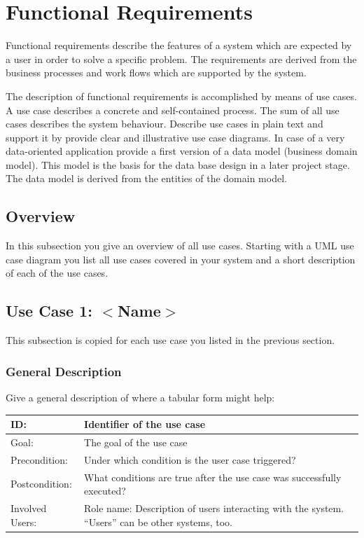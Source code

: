 \documentclass[12pt]{article}
\theoremstyle{definition}
\newenvironment{explanation}{%
   \setlength{\parindent}{0pt}
   \itshape
   \color{blue}
}{}
\begin{document}
\section{Functional Requirements}
\begin{explanation}
Functional requirements describe the features of a system which are expected by a user in order to solve a specific problem. The requirements are derived from the business processes and work flows which are supported by the system.

The description of functional requirements is accomplished by means of use cases. A use case describes a concrete and self-contained process. The sum of all use cases describes the system behaviour. Describe use cases in plain text and support it by provide clear and illustrative use case diagrams.
In case of a very data-oriented application provide a first version of a data model (business domain model). This model is the basis for the data base design in a later project stage. The data model is derived from the entities of the domain model.
\end{explanation}

\subsection{Overview}
\begin{explanation}
In this subsection you give an overview of all use cases. Starting with a UML use case diagram you list all use cases covered in your system and a short description of each of the use cases.
\end{explanation}

\subsection{Use Case 1: $<$Name$>$}
\begin{explanation}
This subsection is copied for each use case you listed in the previous section.
\end{explanation}
\subsubsection{General Description}
\begin{explanation}
Give a general description of where a tabular form might help:
\end{explanation}

\begin{tabular}{|p{.2\linewidth}|p{.65\linewidth}|}
\hline 
ID: & Identifier of the use case \\ \hline
Goal: & The goal of the use case \\ \hline
Precondition: & Under which condition is the user case triggered? \\ \hline
Postcondition: & What conditions are true after the use case was successfully executed? \\ \hline
Involved Users: &Role name: Description of users interacting with the system. “Users” can be other systems, too. \\ \hline
\end{tabular}
\end{document}
